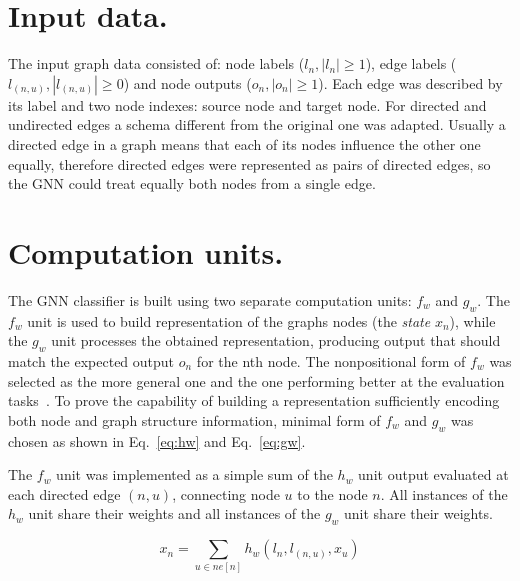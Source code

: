 \documentclass[a4paper, 11pt, twocolumn]{spie}  %
\begin{document}
\section{Input data.}
The input graph data consisted of: node labels ($l_n, |l_n| \geq 1$), edge labels ($l_{(n,u)}, |l_{(n,u)}| \geq 0$) and node outputs ($o_n, |o_n| \geq 1$). Each edge was described by its label and two node indexes: source node and target node. For directed and undirected edges a schema different from the original one was adapted. Usually a directed edge in a graph means that each of its nodes influence the other one equally, therefore directed edges were represented as pairs of directed edges, so the GNN could treat equally both nodes from a single edge.

\section{Computation units.}
The GNN classifier is built using two separate computation units: $f_w$ and $g_w$. The $f_w$ unit is used to build representation of the graphs nodes (the \emph{state} $x_n$), while the $g_w$ unit processes the obtained representation, producing output that should match the expected output $o_n$ for the nth node. The nonpositional form of $f_w$ was selected as the more general one and the one performing better at the evaluation tasks~\cite{scarselli2009graph}. To prove the capability of building a representation sufficiently encoding both node and graph structure information, minimal form of $f_w$ and $g_w$ was chosen as shown in Eq.~\ref{eq:hw} and Eq.~\ref{eq:gw}.

 \noindent
The $f_w$ unit was implemented as a simple sum of the $h_w$ unit output evaluated at each directed edge $(n, u)$, connecting node $u$ to the node $n$. All instances of the $h_w$ unit share their weights and all instances of the $g_w$ unit share their weights. 


\begin{equation}
x_n = \sum_{u \in ne[n]} h_w(l_n, l_{(n, u)}, x_u)
\label{eq:hw}
\end{equation}
\end{document}
